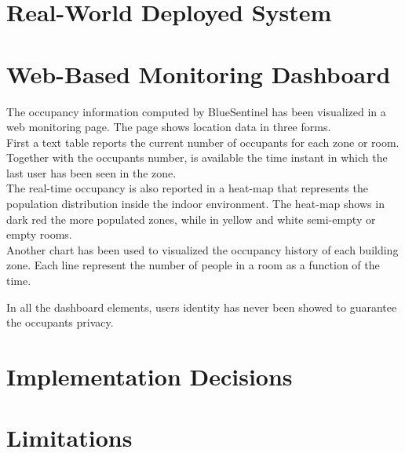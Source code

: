 \section{Real-World Deployed System}
\label{sec:lab}

\section{Web-Based Monitoring Dashboard}
\label{sec:webmonitor}
The occupancy information computed by BlueSentinel has been visualized in a web monitoring page. The page shows location data in three forms.\\
First a text table reports the current number of occupants for each zone or room. Together with the occupants number, is available the time instant in which the last user has been seen in the zone.\\
The real-time occupancy is also reported in a heat-map that represents the population distribution inside the indoor environment. The heat-map shows in dark red the more populated zones, while in yellow and white semi-empty or empty rooms.\\
Another chart has been used to visualized the occupancy history of each building zone. Each line represent the number of people in a room as a function of the time.

In all the dashboard elements, users identity has never been showed to guarantee the occupants privacy.


\section{Implementation Decisions}
\label{sec:decisions}

\section{Limitations}
\label{sec:limitations}
%
%
